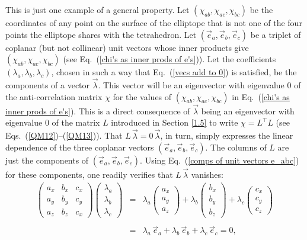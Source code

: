 This is just one example of a general property. Let $(\chi_{ab}, \chi_{ac}, \chi_{bc})$ be the coordinates of any point on the surface of the elliptope that is not one of the four points the elliptope shares with the tetrahedron. Let $(\vec{e}_a, \vec{e}_b, \vec{e}_c)$ be a triplet of coplanar (but not collinear) unit vectors whose inner products give $(\chi_{ab}, \chi_{ac}, \chi_{bc})$ (see Eq.\ (\ref{chi's as inner prods of e's})). Let the coefficients $(\lambda_a, \lambda_b, \lambda_c)$, chosen in such a way that Eq.\ (\ref{vecs add to 0}) is satisfied, be the components of a vector $\vec{\lambda}$. This vector will be an eigenvector with eigenvalue 0 of the anti-correlation matrix $\chi$ for the values of $(\chi_{ab}, \chi_{ac}, \chi_{bc})$ in Eq.\ (\ref{chi's as inner prods of e's}). This is a direct consequence of  $\vec{\lambda}$ being an eigenvector with eigenvalue 0 of the matrix $L$ introduced in Section \ref{1.5} to write $\chi = L^\top L$ (see Eqs.\ (\ref{QM12})--(\ref{QM13})). That $L \, \vec{\lambda} = 0 \, \vec{\lambda}$, in turn, simply expresses the linear dependence of the three coplanar vectors $(\vec{e}_a, \vec{e}_b, \vec{e}_c)$. The columns of $L$ are just the components of $(\vec{e}_a, \vec{e}_b, \vec{e}_c)$. Using Eq.\ (\ref{comps of unit vectors e_abc}) for these components, one readily verifies that $L \, \vec{\lambda}$ vanishes:
\begin{eqnarray}
\begin{pmatrix}
a_x & b_x & c_x  \\
a_y & b_y & c_y  \\
a_z & b_z & c_x
\end{pmatrix} \!\!
\begin{pmatrix}
\lambda_a \\
\lambda_b \\
\lambda_c
\end{pmatrix}
& \! \! = \! \! &
\lambda_a \!
\begin{pmatrix}
a_x  \\
a_y \\
a_z
\end{pmatrix}
+
\lambda_b \!
\begin{pmatrix}
b_x  \\
b_y \\
b_z
\end{pmatrix}
+
\lambda_c \!
\begin{pmatrix}
c_x  \\
c_y \\
c_z
\end{pmatrix} \nonumber \\[-.2cm]
 & & \label{eigenvector of L} \\
 & \! \! = \! \! & \lambda_a \, \vec{e}_a + \lambda_b \, \vec{e}_b + \lambda_c \, \vec{e}_c = 0, \nonumber
\end{eqnarray}

